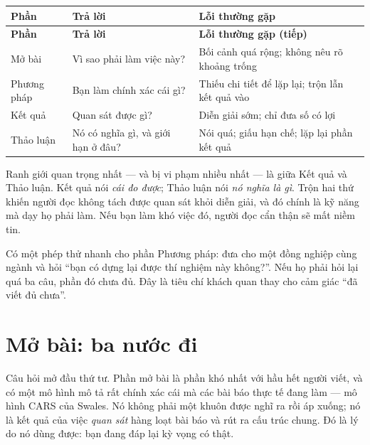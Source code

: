 \documentclass[../../english.tex]{subfiles}
\begin{document}
\begin{center}\footnotesize
{}
\begin{longtable}{@{}L{2.4cm}L{5.0cm}L{7.0cm}@{}}
\toprule
\textbf{Phần} & \textbf{Trả lời} & \textbf{Lỗi thường gặp}\\
\midrule
\endfirsthead
\toprule
\textbf{Phần} & \textbf{Trả lời} & \textbf{Lỗi thường gặp (tiếp)}\\
\midrule
\endhead
Mở bài & Vì sao phải làm việc này? & Bối cảnh quá rộng; không nêu rõ khoảng trống\\
Phương pháp & Bạn làm chính xác cái gì? & Thiếu chi tiết để lặp lại; trộn lẫn kết quả vào\\
Kết quả & Quan sát được gì? & Diễn giải sớm; chỉ đưa số có lợi\\
Thảo luận & Nó có nghĩa gì, và giới hạn ở đâu? & Nói quá; giấu hạn chế; lặp lại phần kết quả\\
\bottomrule
\end{longtable}
\end{center}

Ranh giới quan trọng nhất --- và bị vi phạm nhiều nhất --- là giữa Kết quả và Thảo luận. Kết quả nói \emph{cái đo được}; Thảo luận nói \emph{nó nghĩa là gì}. Trộn hai thứ khiến người đọc không tách được quan sát khỏi diễn giải, và đó chính là kỹ năng mà  dạy họ phải làm. Nếu bạn làm khó việc đó, người đọc cẩn thận sẽ mất niềm tin.

\begin{cannho}
Có một phép thử nhanh cho phần Phương pháp: đưa cho một đồng nghiệp cùng ngành và hỏi ``bạn có dựng lại được thí nghiệm này không?''. Nếu họ phải hỏi lại quá ba câu, phần đó chưa đủ. Đây là tiêu chí khách quan thay cho cảm giác ``đã viết đủ chưa''.
\end{cannho}

\section{Mở bài: ba nước đi}

Câu hỏi mở đầu thứ tư. Phần mở bài là phần khó nhất với hầu hết người viết, và có một mô hình mô tả rất chính xác cái mà các bài báo thực tế đang làm --- mô hình CARS của Swales\cite{swales1990}. Nó không phải một khuôn được nghĩ ra rồi áp xuống; nó là kết quả của việc \emph{quan sát} hàng loạt bài báo và rút ra cấu trúc chung. Đó là lý do nó dùng được: bạn đang đáp lại kỳ vọng có thật.
\end{document}
